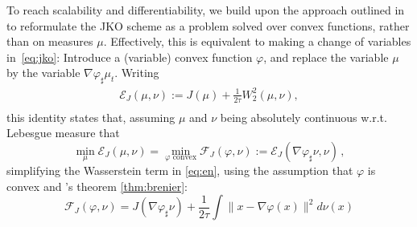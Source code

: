 To reach scalability and differentiability, we build upon the approach outlined in \citet{benamou2016discretization} to reformulate the \acrshort{JKO} scheme as a problem solved over convex functions, rather than on measures $\mu$. Effectively, this is equivalent to making a change of variables in~\eqref{eq:jko}: Introduce a (variable) convex function $\varphi$, and replace the variable $\mu$ by the variable $\nabla \varphi_{\sharp}\mu_t$. Writing
\begin{equation}\label{eq:en}
\begin{split}
\mathcal{E}_J(\mu, \nu) := J(\mu) +\frac{1}{2 \tau}W_2^2(\mu, \nu),\\
\end{split}
\end{equation}
this identity states that, assuming $\mu$ and $\nu$ being absolutely continuous w.r.t. Lebesgue measure that
$$\min_{\mu}\mathcal{E}_J(\mu,\nu) = \min_{\varphi \text{ convex}} \mathcal{F}_J(\varphi, \nu):= \mathcal{E}_J(\nabla \varphi_{\sharp}\nu, \nu)\,,$$
simplifying the Wasserstein term in \eqref{eq:en}, using the assumption that $\varphi$ is convex and \citeauthor{brenier1987decomposition}'s theorem \cref{thm:brenier}:
\begin{equation}\mathcal{F}_J(\varphi, \nu) = J(\nabla \varphi_{\sharp}\nu) +\frac{1}{2 \tau} \!\! \int\!\! \| x - \nabla \varphi(x) \|^2 d \nu(x)\label{eq:jko_psi}
\end{equation}

